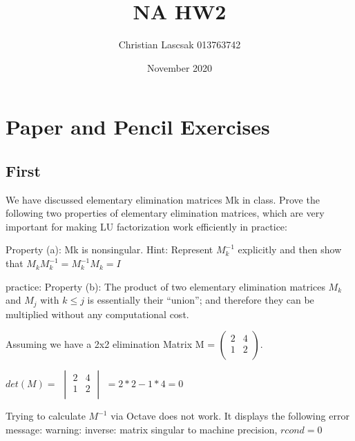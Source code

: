 \documentclass{article}
\title{NA HW2}
\author{Christian Lascsak 013763742}
\date{November 2020}
\begin{document}
\maketitle

\section{Paper and Pencil Exercises}
\subsection{First}
We have discussed elementary elimination matrices Mk in class. Prove the
following two properties of elementary elimination matrices, which are very important for
making LU factorization work efficiently in practice:

\par\noindent
Property (a): Mk is nonsingular.
Hint: Represent \(M_k^{-1}\)
explicitly and then show that \(M_k M_k^{-1} = M_k^{-1} M_k = I\)
\par
\noindent
practice:
Property (b): The product of two elementary elimination matrices \(M_k\) and \(M_j\) with \(k \leq j\) is essentially their “union”; and therefore they can be multiplied without any computational
cost.
\par\noindent
Assuming we have a 2x2 elimination Matrix M =
$\left( \begin{array}{rrrr}
2 & 4\\
1 & 2\\
\end{array}\right)$.

\(det(M) =\) $\begin{vmatrix}
2 & 4\\
1 & 2\\
\end{vmatrix}$ \(= 2*2 - 1*4 = 0\)

\par\noindent
Trying to calculate \(M^{-1}\) via Octave does not work. It displays the following error message:
warning: inverse: matrix singular to machine precision, \(rcond = 0\)
\newline
\end{document}
